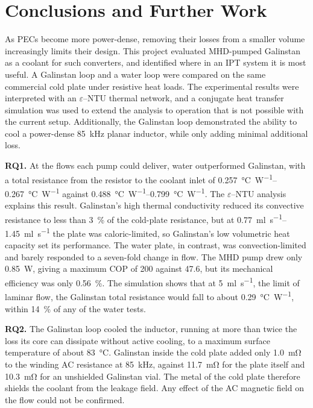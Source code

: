 \chapter{Conclusions and Further Work}
\label{ch:conclusion}

As PECs become more power-dense, removing their losses from a smaller volume
increasingly limits their design. This project evaluated MHD-pumped Galinstan as
a coolant for such converters, and identified where in an IPT system it is most
useful. A Galinstan loop and a water loop were compared on the same commercial
cold plate under resistive heat loads. The experimental results were interpreted
with an $\varepsilon$--NTU thermal network, and a conjugate heat transfer
simulation was used to extend the analysis to operation that is not possible
with the current setup.
Additionally, the Galinstan loop demonstrated the ability to cool a power-dense
\SI{85}{\kilo\hertz} planar inductor, while only adding minimal additional loss.

\textbf{RQ1.} At the flows each pump could deliver, water outperformed
Galinstan, with a total resistance from the resistor to the coolant inlet of
\SIrange{0.257}{0.267}{\celsius\per\watt} against
\SIrange{0.488}{0.799}{\celsius\per\watt}. The $\varepsilon$--NTU analysis
explains this result. Galinstan's high thermal conductivity
reduced its convective resistance to less than \SI{3}{\percent} of the cold-plate
resistance, but at \SIrange{0.77}{1.45}{\milli\litre\per\second} the plate was
caloric-limited, so Galinstan's low volumetric heat capacity set its
performance. The water plate, in contrast, was convection-limited and barely
responded to a seven-fold change in flow. The MHD pump drew only
\SI{0.85}{\watt}, giving a maximum
COP of 200 against 47.6, but its mechanical efficiency was only
\SI{0.56}{\percent}. The simulation shows that at
\SI{5}{\milli\litre\per\second}, the limit of laminar flow, the Galinstan total
resistance would fall to about \SI{0.29}{\celsius\per\watt}, within
\SI{14}{\percent} of any of the water tests.

\textbf{RQ2.} The Galinstan loop cooled the inductor, running at more than twice
the loss its core can dissipate without active cooling, to a maximum surface
temperature of about \SI{83}{\celsius}. Galinstan inside the cold plate added
only \SI{1.0}{\milli\ohm} to the winding AC resistance at
\SI{85}{\kilo\hertz}, against \SI{11.7}{\milli\ohm} for the plate itself and
\SI{10.3}{\milli\ohm} for an unshielded Galinstan vial. The metal of
the cold plate therefore shields the coolant from the leakage field.
Any effect of the AC magnetic field on the flow could not be confirmed.

